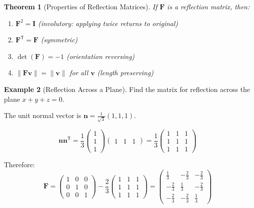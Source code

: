 \documentclass[12pt]{article}
\numberwithin{equation}{section}
\newcommand{\vect}[1]{\boldsymbol{#1}}   %
\newcommand{\mat}[1]{\mathbf{#1}}        %
\newcommand{\trans}{\mathsf{T}}          %
\theoremstyle{plain}
\newtheorem{theorem}{Theorem}[section]
\theoremstyle{definition}
\newtheorem{example}[theorem]{Example}
\theoremstyle{remark}
\begin{document}
\begin{theorem}[Properties of Reflection Matrices]
If $\mat{F}$ is a reflection matrix, then:
\begin{enumerate}
\item $\mat{F}^2 = \mat{I}$ (involutory: applying twice returns to original)
\item $\mat{F}^{\trans} = \mat{F}$ (symmetric)
\item $\det(\mat{F}) = -1$ (orientation reversing)
\item $\|\mat{F}\vect{v}\| = \|\vect{v}\|$ for all $\vect{v}$ (length preserving)
\end{enumerate}
\end{theorem}

\begin{example}[Reflection Across a Plane]
Find the matrix for reflection across the plane $x + y + z = 0$.

The unit normal vector is $\vect{n} = \frac{1}{\sqrt{3}}(1, 1, 1)$.

$$\vect{n}\vect{n}^{\trans} = \frac{1}{3}\begin{pmatrix} 1 \\ 1 \\ 1 \end{pmatrix}\begin{pmatrix} 1 & 1 & 1 \end{pmatrix} = \frac{1}{3}\begin{pmatrix} 1 & 1 & 1 \\ 1 & 1 & 1 \\ 1 & 1 & 1 \end{pmatrix}$$

Therefore:
$$\mat{F} = \begin{pmatrix} 1 & 0 & 0 \\ 0 & 1 & 0 \\ 0 & 0 & 1 \end{pmatrix} - \frac{2}{3}\begin{pmatrix} 1 & 1 & 1 \\ 1 & 1 & 1 \\ 1 & 1 & 1 \end{pmatrix} = \begin{pmatrix} \frac{1}{3} & -\frac{2}{3} & -\frac{2}{3} \\ -\frac{2}{3} & \frac{1}{3} & -\frac{2}{3} \\ -\frac{2}{3} & -\frac{2}{3} & \frac{1}{3} \end{pmatrix}$$


\end{example}
\end{document}

